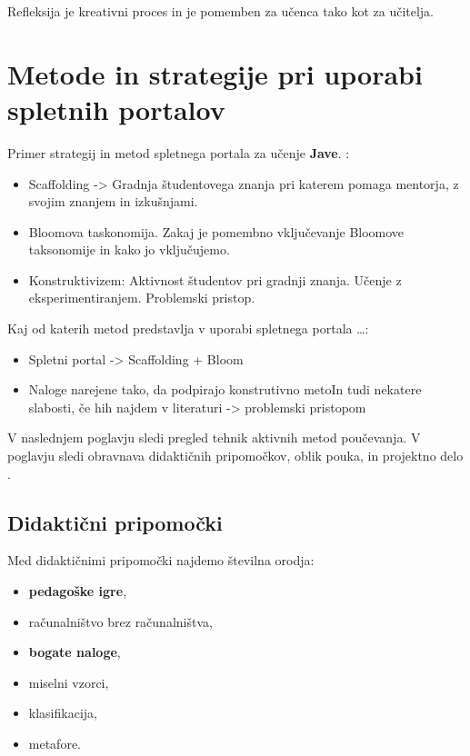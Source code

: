 Refleksija je kreativni proces in je pomemben za učenca tako kot za
učitelja.

\section{Metode in strategije pri uporabi spletnih portalov}
\label{sec:Metode_in_strategije_pri_učenju_programiranja}

Primer strategij in metod spletnega portala za učenje \textbf{Jave}.
\cite{thesisAWebP}:

\begin{itemize}
\tightlist
\item
  Scaffolding -\textgreater{} Gradnja študentovega znanja
  pri katerem pomaga mentorja, z svojim znanjem in izkušnjami.
\item
  Bloomova taskonomija. Zakaj je pomembno vključevanje Bloomove
  taksonomije in kako jo vključujemo.
\item
  Konstruktivizem: Aktivnost študentov pri gradnji znanja. Učenje z
  eksperimentiranjem. Problemski pristop.
\end{itemize}

Kaj od katerih metod predstavlja v uporabi spletnega portala \ldots{}:

\begin{itemize}
\tightlist
\item
  Spletni portal -\textgreater{} Scaffolding + Bloom
\item
  Naloge narejene tako, da podpirajo konstrutivno metoIn tudi nekatere slabosti, če hih najdem v literaturi
  -\textgreater{} problemski pristopom
\end{itemize}

V naslednjem poglavju sledi pregled tehnik aktivnih metod
poučevanja. V poglavju sledi obravnava didaktičnih pripomočkov, oblik
pouka, in projektno delo \cite{guideTCS}.
\subsection{Didaktični pripomočki}
\label{sec:didaktični_pripomočki}

Med didaktičnimi pripomočki najdemo številna orodja:

\begin{itemize}
\tightlist
\item \textbf{pedagoške igre},
\item računalništvo brez računalništva,
\item \textbf{bogate naloge},
\item miselni vzorci,
\item klasifikacija,
\item metafore.
\end{itemize}

